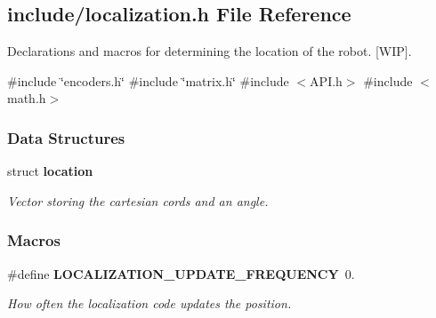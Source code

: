 \subsection{include/localization.h File Reference}
\label{a00032}


Declarations and macros for determining the location of the robot. [W\+IP].  


{\ttfamily \#include \char`\"{}encoders.\+h\char`\"{}}\newline
{\ttfamily \#include \char`\"{}matrix.\+h\char`\"{}}\newline
{\ttfamily \#include $<$A\+P\+I.\+h$>$}\newline
{\ttfamily \#include $<$math.\+h$>$}\newline
\subsubsection*{Data Structures}
\begin{DoxyCompactItemize}
\item 
struct \textbf{ location}
\begin{DoxyCompactList}\small\item\em Vector storing the cartesian cords and an angle. \end{DoxyCompactList}\end{DoxyCompactItemize}
\subsubsection*{Macros}
\begin{DoxyCompactItemize}
\item 
\#define \textbf{ L\+O\+C\+A\+L\+I\+Z\+A\+T\+I\+O\+N\+\_\+\+U\+P\+D\+A\+T\+E\+\_\+\+F\+R\+E\+Q\+U\+E\+N\+CY}~0.
\begin{DoxyCompactList}\small\item\em How often the localization code updates the position. \end{DoxyCompactList}\end{DoxyCompactItemize}
